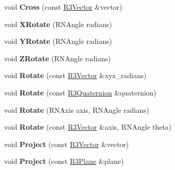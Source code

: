 \begin{DoxyCompactItemize}
\item 
void {\bfseries Cross} (const \hyperlink{class_r3_vector}{R3\+Vector} \&vector)\hypertarget{class_r3_vector_a8b59a512bbb5023323b2b7162d918157}{}\label{class_r3_vector_a8b59a512bbb5023323b2b7162d918157}

\item 
void {\bfseries X\+Rotate} (R\+N\+Angle radians)\hypertarget{class_r3_vector_ab62dd1bda4a7febe07323172cc8a7066}{}\label{class_r3_vector_ab62dd1bda4a7febe07323172cc8a7066}

\item 
void {\bfseries Y\+Rotate} (R\+N\+Angle radians)\hypertarget{class_r3_vector_aa45d5f359f9300c196985e57a3bb1573}{}\label{class_r3_vector_aa45d5f359f9300c196985e57a3bb1573}

\item 
void {\bfseries Z\+Rotate} (R\+N\+Angle radians)\hypertarget{class_r3_vector_a02549961fe89cfda4308755a429bf25d}{}\label{class_r3_vector_a02549961fe89cfda4308755a429bf25d}

\item 
void {\bfseries Rotate} (const \hyperlink{class_r3_vector}{R3\+Vector} \&xyz\+\_\+radians)\hypertarget{class_r3_vector_a1a8bfaef8b4bf187b4bc08979b2d8231}{}\label{class_r3_vector_a1a8bfaef8b4bf187b4bc08979b2d8231}

\item 
void {\bfseries Rotate} (const \hyperlink{class_r3_quaternion}{R3\+Quaternion} \&quaternion)\hypertarget{class_r3_vector_a05ee279b9734396be112e0f29021ec1d}{}\label{class_r3_vector_a05ee279b9734396be112e0f29021ec1d}

\item 
void {\bfseries Rotate} (R\+N\+Axis axis, R\+N\+Angle radians)\hypertarget{class_r3_vector_a8a9ff8e231372bf39c91527af828eb8f}{}\label{class_r3_vector_a8a9ff8e231372bf39c91527af828eb8f}

\item 
void {\bfseries Rotate} (const \hyperlink{class_r3_vector}{R3\+Vector} \&axis, R\+N\+Angle theta)\hypertarget{class_r3_vector_a9a0c2d3bd034fe84bf51d39dc4fdef26}{}\label{class_r3_vector_a9a0c2d3bd034fe84bf51d39dc4fdef26}

\item 
void {\bfseries Project} (const \hyperlink{class_r3_vector}{R3\+Vector} \&vector)\hypertarget{class_r3_vector_a291be1f4e4560a261f6b14c6ae1c47d8}{}\label{class_r3_vector_a291be1f4e4560a261f6b14c6ae1c47d8}

\item 
void {\bfseries Project} (const \hyperlink{class_r3_plane}{R3\+Plane} \&plane)\hypertarget{class_r3_vector_a8e1cff25078db4c749262b7412bdada2}{}\label{class_r3_vector_a8e1cff25078db4c749262b7412bdada2}


\end{DoxyCompactItemize}
